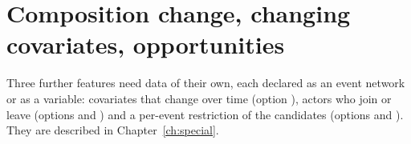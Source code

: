 \section{Composition change, changing covariates, opportunities}

Three further features need data of their own, each declared as an event network or as a variable: covariates that change over time (option ), actors who join or leave (options  and ) and a per-event restriction of the candidates (options  and ). They are described in Chapter~\ref{ch:special}.

